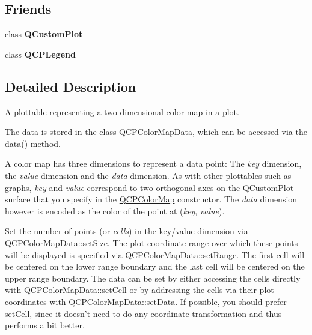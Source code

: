 \subsection*{\-Friends}
\begin{DoxyCompactItemize}
\item 
\hypertarget{classQCPColorMap_a1cdf9df76adcfae45261690aa0ca2198}{class {\bfseries \-Q\-Custom\-Plot}}\label{classQCPColorMap_a1cdf9df76adcfae45261690aa0ca2198}

\item 
\hypertarget{classQCPColorMap_a8429035e7adfbd7f05805a6530ad5e3b}{class {\bfseries \-Q\-C\-P\-Legend}}\label{classQCPColorMap_a8429035e7adfbd7f05805a6530ad5e3b}

\end{DoxyCompactItemize}


\subsection{\-Detailed \-Description}
\-A plottable representing a two-\/dimensional color map in a plot. 



\-The data is stored in the class \hyperlink{classQCPColorMapData}{\-Q\-C\-P\-Color\-Map\-Data}, which can be accessed via the \hyperlink{classQCPColorMap_a3ae12c9ce842352037cd20ea5267414f}{data()} method.

\-A color map has three dimensions to represent a data point\-: \-The {\itshape key\/} dimension, the {\itshape value\/} dimension and the {\itshape data\/} dimension. \-As with other plottables such as graphs, {\itshape key\/} and {\itshape value\/} correspond to two orthogonal axes on the \hyperlink{classQCustomPlot}{\-Q\-Custom\-Plot} surface that you specify in the \hyperlink{classQCPColorMap}{\-Q\-C\-P\-Color\-Map} constructor. \-The {\itshape data\/} dimension however is encoded as the color of the point at ({\itshape key\/}, {\itshape value\/}).

\-Set the number of points (or {\itshape cells\/}) in the key/value dimension via \hyperlink{classQCPColorMapData_a0d9ff35c299d0478b682bfbcdd9c097e}{\-Q\-C\-P\-Color\-Map\-Data\-::set\-Size}. \-The plot coordinate range over which these points will be displayed is specified via \hyperlink{classQCPColorMapData_aad9c1c7c703c1339489fc730517c83d4}{\-Q\-C\-P\-Color\-Map\-Data\-::set\-Range}. \-The first cell will be centered on the lower range boundary and the last cell will be centered on the upper range boundary. \-The data can be set by either accessing the cells directly with \hyperlink{classQCPColorMapData_a8e75eaf8746596319032a93f3d2d0683}{\-Q\-C\-P\-Color\-Map\-Data\-::set\-Cell} or by addressing the cells via their plot coordinates with \hyperlink{classQCPColorMapData_afd2083ccfd6987ec94aa7ef8e91ca39a}{\-Q\-C\-P\-Color\-Map\-Data\-::set\-Data}. \-If possible, you should prefer set\-Cell, since it doesn't need to do any coordinate transformation and thus performs a bit better.


